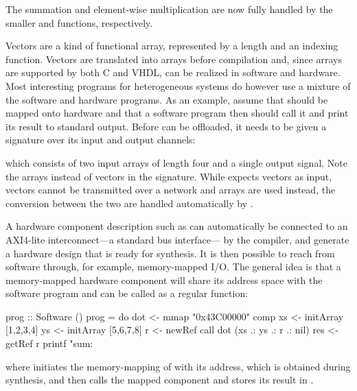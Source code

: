 \documentclass[../paper.tex]{subfiles}
\begin{document}
\noindent The summation and element-wise multiplication are now fully handled by the smaller  and  functions, respectively.


Vectors are a kind of functional array, represented by a length and an indexing function. Vectors are translated into arrays before compilation and, since arrays are supported by both C and VHDL,  can be realized in software and hardware. Most interesting programs for heterogeneous systems do however use a mixture of the software and hardware programs. As an example, assume that  should be mapped onto hardware and that a software program then should call it and print its result to standard output. Before  can be offloaded, it needs to be given a signature over its input and output channels:



\noindent which consists of two input arrays of length four and a single output signal. Note the arrays instead of vectors in the signature. While  expects vectors as input, vectors cannot be transmitted over a network and arrays are used instead, the conversion between the two are handled automatically by .

A hardware component description such as  can automatically be connected to an AXI4-lite interconnect---a standard bus interface--- by the compiler, and generate a hardware design that is ready for synthesis. It is then possible to reach  from software through, for example, memory-mapped I/O. The general idea is that a memory-mapped hardware component will share its address space with the software program and can be called as a regular function:

\begin{code}
prog :: Software ()
prog = do
  dot <- mmap "0x43C00000" comp
  xs  <- initArray [1,2,3,4]
  ys  <- initArray [5,6,7,8]
  r   <- newRef
  call dot (xs .: ys .: r .: nil)
  res <- getRef r
  printf "sum: %
\end{code}

\noindent where  initiates the memory-mapping of  with its address, which is obtained during synthesis, and  then calls the mapped component and stores its result in .
\end{document}
